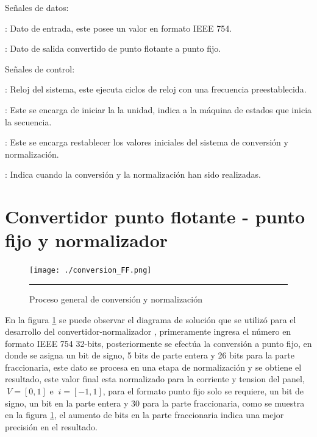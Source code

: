 Señales de datos: 

\begin{compactitem}

\item {}: Dato de entrada, este posee un valor en formato IEEE 754.
\item {}: Dato de salida convertido de punto flotante a punto fijo.

\end{compactitem}

Señales de control: 

\begin{compactitem}

\item {}: Reloj del sistema, este ejecuta ciclos de reloj con una frecuencia preestablecida. 

\item {}: Este se encarga de iniciar la la unidad, indica a la máquina de estados que inicia la secuencia. 

\item {}: Este se encarga restablecer los valores iniciales del sistema de conversión y normalización.

\item {}: Indica cuando la conversión y la normalización han sido realizadas.

\end{compactitem}


 

\section{Convertidor punto flotante - punto fijo y normalizador }


\begin{figure}[H]
  \centering
    \texttt{[image: ./conversion\_FF.png]}
    \rule{35em}{0.5pt}
  \caption[Proceso general de conversión y normalización]{Proceso general de conversión y normalización  }
  \label{fig:FF}
\end{figure}



  En la figura \ref{fig:FF} se puede observar el diagrama de solución que se utilizó para el desarrollo del convertidor-normalizador , primeramente ingresa el número en formato IEEE 754 32-bits, posteriormente se efectúa la conversión a punto fijo, en donde se asigna un bit de signo, 5 bits de parte entera y 26 bits para la parte fraccionaria, este dato se procesa en una etapa de normalización y se obtiene el resultado, este valor final esta normalizado para la corriente y tension del panel, $\ V = [0,1]$ e $\ i = [-1,1]$, para el formato punto fijo solo se requiere, un bit de signo, un bit en la parte entera y 30 para la parte fraccionaria, como se muestra en la figura \ref{fig:FF}, el aumento de bits en la parte fraccionaria indica una mejor precisión en el resultado. 

